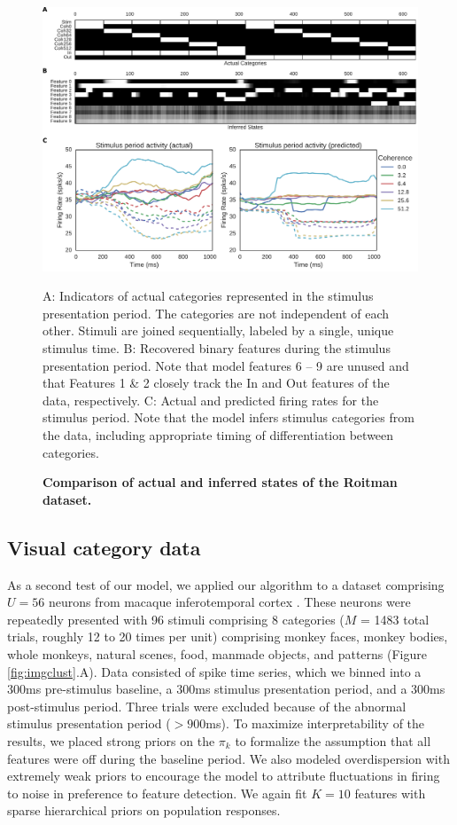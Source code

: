 \documentclass[10pt,letterpaper]{article}
\begin{document}
\begin{figure}[!h]
    \includegraphics[width=\linewidth]{figures/roitman}
	\caption{\bf Comparison of actual and inferred states of the Roitman dataset.}
	A: Indicators of actual categories represented in the stimulus presentation period. The categories are not independent of each other. Stimuli are joined sequentially, labeled by a single, unique stimulus time. B: Recovered binary features during the stimulus presentation period. Note that model features 6 -- 9 are unused and that Features 1 \& 2 closely track the In and Out features of the data, respectively. C: Actual and predicted firing rates for the stimulus period. Note that the model infers stimulus categories from the data, including appropriate timing of differentiation between categories.
	\label{roitman}
\end{figure}

\subsection*{Visual category data}
\label{it_neuron_expt}
As a second test of our model, we applied our algorithm to a dataset comprising $U = 56$ neurons from macaque inferotemporal cortex \cite{McMahon2014-qq}. These neurons were repeatedly presented with 96 stimuli comprising 8 categories ($M$ = 1483 total trials, roughly 12 to 20 times per unit) comprising monkey faces, monkey bodies, whole monkeys, natural scenes, food, manmade objects, and patterns (Figure \ref{fig:imgclust}.A). Data consisted of spike time series, which we binned into a 300ms pre-stimulus baseline, a 300ms stimulus presentation period, and a 300ms post-stimulus period. Three trials were excluded because of the abnormal stimulus presentation period ($>900$ms). To maximize interpretability of the results, we placed strong priors on the $\pi_k$ to formalize the assumption that all features were off during the baseline period. We also modeled overdispersion with extremely weak priors to encourage the model to attribute fluctuations in firing to noise in preference to feature detection. We again fit $K = 10$ features with sparse hierarchical priors on population responses.
\end{document}
